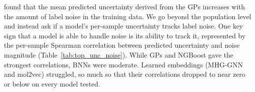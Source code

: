 
\citet{Kolmar2021} found that the mean predicted uncertainty derived from the GPs increases with the amount of label noise in the training data. We go beyond the population level and instead ask if a model's per-sample uncertainty tracks label noise. One key sign that a model is able to handle noise is its ability to track it, represented by the per-sample Spearman correlation between predicted uncertainty and noise magnitude (Table~\ref{tab:top_unc_noise}). While GPs and NGBoost gave the strongest correlations, BNNs were moderate. Learned embeddings (MHG-GNN and mol2vec) struggled, so much so that their correlations dropped to near zero or below on every model tested. 

